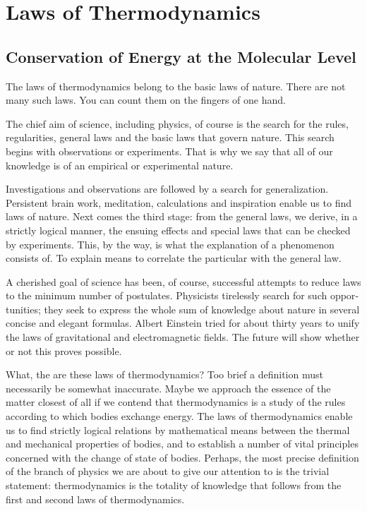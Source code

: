 

\cleardoublepage
\chapter{Laws of Thermodynamics}
\label{ch-08}
\section{Conservation of Energy at the Molecular Level}

The laws of thermodynamics belong to the basic laws of nature. There are not many such laws. You can count them on the fingers of one hand.

The chief aim of science, including physics, of course is the search for the rules, regularities, general laws and the basic laws that govern nature. This search begins with observations or experiments. That is why we say that all of our knowledge is of an empirical or experimen­tal nature. 

Investigations and observations are followed by a search for generalization. Persistent brain work, meditation, calculations and inspiration enable us to find laws of nature. Next comes the third stage: from the general laws, we derive, in a strictly logical manner, the ensuing effects and special laws that can be checked by experiments. This, by the way, is what the explanation of a phenomenon consists of. To explain means to corre­late the particular with the general law.

A cherished goal of science has been, of course, suc­cessful attempts to reduce laws to the minimum number of postulates. Physicists tirelessly search for such oppor­tunities; they seek to express the whole sum of knowledge about nature in several concise and elegant formulas. Albert Einstein tried for about thirty years to unify the laws of gravitational and electromagnetic fields. The future will show whether or not this proves possible.

What, the are these laws of thermodynamics? Too brief a definition must necessarily be somewhat inac­curate. Maybe we approach the essence of the matter clos­est of all if we contend that thermodynamics is a study of the rules according to which bodies exchange energy. The laws of thermodynamics enable us to find strictly logical relations by mathematical means between the thermal and mechanical properties of bodies, and to es­tablish a number of vital principles concerned with the change of state of bodies. Perhaps, the most precise def­inition of the branch of physics we are about to give our attention to is the trivial statement: thermodynamics is the totality of knowledge that follows from the first and second laws of thermodynamics.

